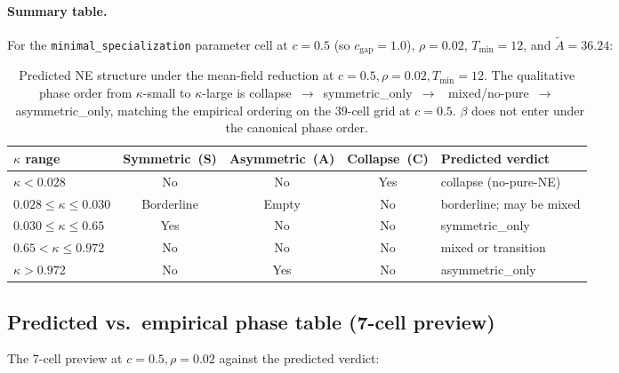 \documentclass{anvil-paper}
\begin{document}
\paragraph{Summary table.}
For the \texttt{minimal\_specialization} parameter cell at $c{=}0.5$
(so $c_{\text{gap}}{=}1.0$), $\rho{=}0.02$, $T_{\min}{=}12$, and
$\tilde A=36.24$:

\begin{table}[h]
  \centering
  \small
  \begin{tabular}{lccc l}
    \toprule
    $\kappa$ range & Symmetric~(S) & Asymmetric~(A) & Collapse~(C)
                   & Predicted verdict \\
    \midrule
    $\kappa<0.028$            & No & No & Yes & \textsf{collapse} (no-pure-NE) \\
    $0.028\leq\kappa\leq 0.030$ & Borderline & Empty & No & borderline; may be \textsf{mixed} \\
    $0.030\leq\kappa\leq 0.65$  & Yes & No  & No  & \textsf{symmetric\_only} \\
    $0.65<\kappa\leq 0.972$     & No  & No  & No  & \textsf{mixed} or transition \\
    $\kappa>0.972$              & No  & Yes & No  & \textsf{asymmetric\_only} \\
    \bottomrule
  \end{tabular}
  \caption{Predicted NE structure under the mean-field reduction at
  $c{=}0.5,\rho{=}0.02,T_{\min}{=}12$. The qualitative phase order
  from $\kappa$-small to $\kappa$-large is
  \textsf{collapse}~$\to$~\textsf{symmetric\_only}~$\to$~%
  \textsf{mixed}/no-pure~$\to$~\textsf{asymmetric\_only}, matching the
  empirical ordering on the 39-cell grid at $c{=}0.5$. $\beta$ does not
  enter under the canonical phase order.}
  \label{tab:ne-predicted}
\end{table}

\subsection{Predicted vs.\ empirical phase table (7-cell preview)}
\label{app:nestructure:phasetable}

The 7-cell preview at $c{=}0.5,\rho{=}0.02$ against the predicted
verdict:
\end{document}
